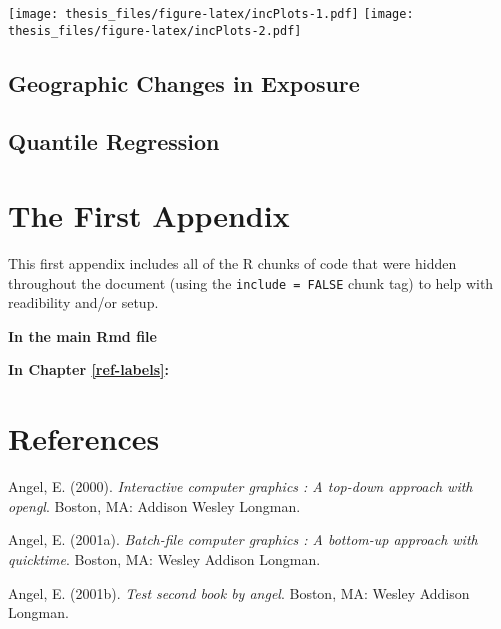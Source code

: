\documentclass[12pt,twoside]{dukestatscithesis}
\theoremstyle{definition}
\theoremstyle{definition}
\theoremstyle{definition}
\theoremstyle{remark}
\begin{document}
\texttt{[image: thesis\_files/figure-latex/incPlots-1.pdf]}
\texttt{[image: thesis\_files/figure-latex/incPlots-2.pdf]}

\section{Geographic Changes in
Exposure}\label{geographic-changes-in-exposure}

\section{Quantile Regression}\label{quantile-regression}

\appendix

\chapter{The First Appendix}\label{the-first-appendix}

This first appendix includes all of the R chunks of code that were
hidden throughout the document (using the \texttt{include\ =\ FALSE}
chunk tag) to help with readibility and/or setup.

\textbf{In the main Rmd file}

\textbf{In Chapter \ref{ref-labels}:}

\backmatter

\chapter*{References}\label{references}


\noindent

\setlength{\parindent}{-0.20in} \setlength{\leftskip}{0.20in}
\setlength{\parskip}{8pt}

\hypertarget{refs}{}
\hypertarget{ref-angel2000}{}
Angel, E. (2000). \emph{Interactive computer graphics : A top-down
approach with opengl}. Boston, MA: Addison Wesley Longman.

\hypertarget{ref-angel2001}{}
Angel, E. (2001a). \emph{Batch-file computer graphics : A bottom-up
approach with quicktime}. Boston, MA: Wesley Addison Longman.

\hypertarget{ref-angel2002a}{}
Angel, E. (2001b). \emph{Test second book by angel}. Boston, MA: Wesley
Addison Longman.


\end{document}
